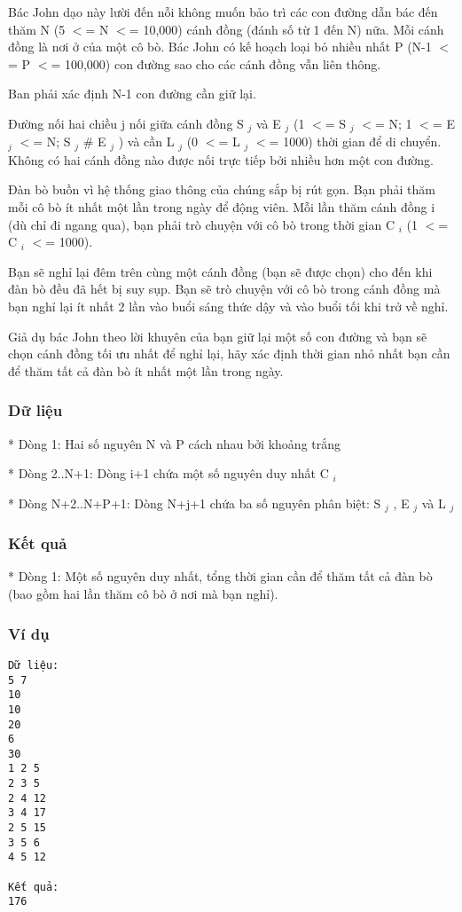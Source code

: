 



   Bác John dạo này lười đến nỗi không muốn bảo trì các con đường dẫn bác đến thăm N (5 $<$= N $<$= 10,000) cánh đồng (đánh số từ 1 đến N) nữa. Mỗi cánh đồng là nơi ở của một cô bò. Bác John có kế hoạch loại bỏ nhiều nhất P (N-1 $<$= P $<$= 100,000) con đường sao cho các cánh đồng vẫn liên thông.  

   Ban phải xác định N-1 con đường cần giữ lại.  

   Đường nối hai chiều j nối giữa cánh đồng S   $_    j   $   và E   $_    j   $   (1 $<$= S   $_    j   $   $<$= N; 1 $<$= E   $_    j   $   $<$= N; S   $_    j   $   \# E   $_    j   $   ) và cần L   $_    j   $   (0 $<$= L   $_    j   $   $<$= 1000) thời gian để di chuyển. Không có hai cánh đồng nào được nối trực tiếp bởi nhiều hơn một con đường.  

   Đàn bò buồn vì hệ thống giao thông của chúng sắp bị rút gọn. Bạn phải thăm mỗi cô bò ít nhất một lần trong ngày để động viên. Mỗi lần thăm cánh đồng i (dù chỉ đi ngang qua), bạn phải trò chuyện với cô bò trong thời gian C   $_    i   $   (1 $<$= C   $_    i   $   $<$= 1000).  

   Bạn sẽ nghỉ lại đêm trên cùng một cánh đồng (bạn sẽ được chọn) cho đến khi đàn bò đều đã hết bị suy sụp. Bạn sẽ trò chuyện với cô bò trong cánh đồng mà bạn nghỉ lại ít nhất 2 lần vào buổi sáng thức dậy và vào buổi tối khi trở về nghỉ.  

   Giả dụ bác John theo lời khuyên của bạn giữ lại một số con đường và bạn sẽ chọn cánh đồng tối ưu nhất để nghỉ lại, hãy xác định thời gian nhỏ nhất bạn cần để thăm tất cả đàn bò ít nhất một lần trong ngày.  

\subsubsection{   Dữ liệu  }

   * Dòng 1: Hai số nguyên N và P cách nhau bởi khoảng trắng  

   * Dòng 2..N+1: Dòng i+1 chứa một số nguyên duy nhất C   $_    i   $

   * Dòng N+2..N+P+1: Dòng N+j+1 chứa ba số nguyên phân biệt: S   $_    j   $   , E   $_    j   $   và L   $_    j   $

\subsubsection{   Kết quả  }

   * Dòng 1: Một số nguyên duy nhất, tổng thời gian cần để thăm tất cả đàn bò (bao gồm hai lần thăm cô bò ở nơi mà bạn nghỉ).  

\subsubsection{   Ví dụ  }
\begin{verbatim}
Dữ liệu:
5 7
10
10
20
6
30
1 2 5
2 3 5
2 4 12
3 4 17
2 5 15
3 5 6
4 5 12

Kết quả:
176
\end{verbatim}